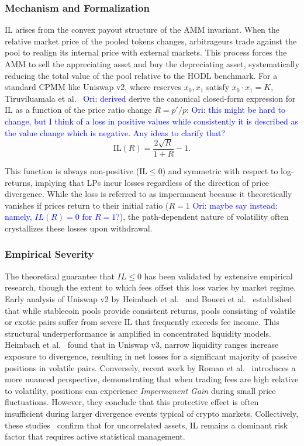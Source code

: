 \documentclass[journal]{IEEEtran}
\newcommand{\ori}[1]{\textcolor{blue}{Ori: #1}}
\begin{document}
\subsubsection{Mechanism and Formalization}
IL arises from the convex payout structure of the AMM invariant. When the relative market price of the pooled tokens changes, arbitrageurs trade against the pool to realign its internal price with external markets. This process forces the AMM to sell the appreciating asset and buy the depreciating asset, systematically reducing the total value of the pool relative to the HODL benchmark.
For a standard CPMM like Uniswap v2, where reserves $x_0, x_1$ satisfy $x_0 \cdot x_1 = K$, Tiruviluamala et al.~\cite{tiruviluamala2022general} \ori{derived} derive the canonical closed-form expression for IL as a function of the price ratio change $R = p'/p$:
\ori{this might be hard to change, but I think of a loss in positive values while consistently it is described as the value change which is negative. Any ideas to clarify that?}
\begin{equation}
    \mathrm{IL}(R) = \frac{2\sqrt{R}}{1+R} - 1.
    \label{eq:il_canonical}
\end{equation}

This function is always non-positive ($\mathrm{IL} \le 0$) and symmetric with respect to log-returns, implying that LPs incur losses regardless of the direction of price divergence. While the loss is referred to as impermanent because it theoretically vanishes if prices return to their initial ratio ($R=1$ \ori{maybe say instead: namely, $IL(R)=0$ for $R=1$?}), the path-dependent nature of volatility often crystallizes these losses upon withdrawal.

\subsubsection{Empirical Severity}
The theoretical guarantee that $IL \le 0$ has been validated by extensive empirical research, though the extent to which fees offset this loss varies by market regime. Early analysis of Uniswap v2 by Heimbach et al.~\cite{heimbach2021behavior} and Boueri et al.~\cite{boueri2021g3m} established that while stablecoin pools provide consistent returns, pools consisting of volatile or exotic pairs suffer from severe IL that frequently exceeds fee income. This structural underperformance is amplified in concentrated liquidity models. Heimbach et al.~\cite{heimbach2022risks} found that in Uniswap v3, narrow liquidity ranges increase exposure to divergence, resulting in net losses for a significant majority of passive positions in volatile pairs.
Conversely, recent work by Roman et al.~\cite{roman2025impact} introduces a more nuanced perspective, demonstrating that when trading fees are high relative to volatility, positions can experience \textit{Impermanent Gain} during small price fluctuations. However, they conclude that this protective effect is often insufficient during larger divergence events typical of crypto markets. Collectively, these studies~\cite{heimbach2021behavior, boueri2021g3m, heimbach2022risks, roman2025impact} confirm that for uncorrelated assets, IL remains a dominant risk factor that requires active statistical management.
\end{document}
